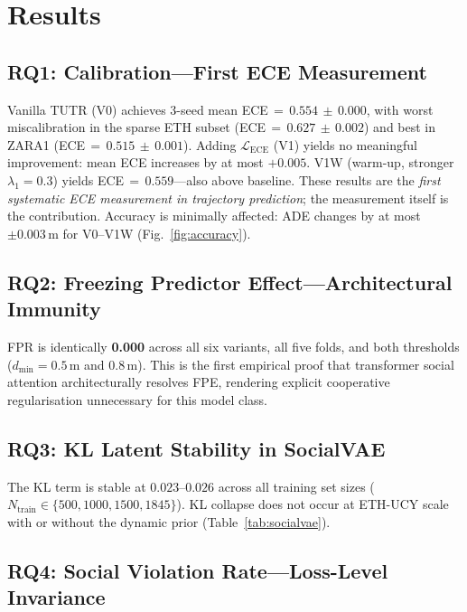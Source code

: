 \documentclass[journal]{IEEEtran}
\begin{document}
\section{Results}
\label{sec:results}

\subsection{RQ1: Calibration---First ECE Measurement}

Vanilla TUTR (V0) achieves 3-seed mean
ECE\,\(=\,0.554\,\pm\,0.000\), with worst miscalibration in the
sparse ETH subset (ECE\,\(=\,0.627\,\pm\,0.002\)) and best in ZARA1
(ECE\,\(=\,0.515\,\pm\,0.001\)).
Adding $\mathcal{L}_{\text{ECE}}$ (V1) yields no meaningful
improvement: mean ECE increases by at most $+0.005$.
V1W (warm-up, stronger $\lambda_1{=}0.3$) yields
ECE\,\(=\,0.559\)---also above baseline.
These results are the \emph{first systematic ECE measurement in
trajectory prediction}; the measurement itself is the contribution.
Accuracy is minimally affected: ADE changes by at most
$\pm0.003$\,m for V0--V1W (Fig.~\ref{fig:accuracy}).

\subsection{RQ2: Freezing Predictor Effect---Architectural Immunity}

FPR is identically \textbf{0.000} across all six variants, all five
folds, and both thresholds ($d_\text{min}{=}0.5$\,m and $0.8$\,m).
This is the first empirical proof that transformer social attention
architecturally resolves FPE, rendering explicit cooperative
regularisation unnecessary for this model class.

\subsection{RQ3: KL Latent Stability in SocialVAE}

The KL term is stable at $0.023$--$0.026$ across all training set
sizes ($N_\text{train}\in\{500,1000,1500,1845\}$).
KL collapse does not occur at ETH-UCY scale with or without the
dynamic prior (Table~\ref{tab:socialvae}).

\subsection{RQ4: Social Violation Rate---Loss-Level Invariance}
\end{document}
